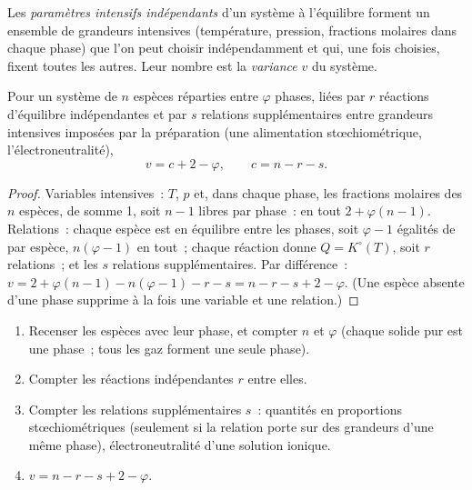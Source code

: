 \begin{definition}[Variance]\label{def:b2:equilibrium-shifts:variance}
Les \emph{paramètres intensifs indépendants}
d'un système à l'équilibre forment un ensemble de grandeurs intensives
(température, pression, fractions molaires dans chaque phase) que l'on peut choisir
indépendamment et qui, une fois choisies, fixent toutes les autres. Leur nombre est la
\emph{variance} $v$ du système.
\end{definition}

\begin{theorem}\label{thm:b2:equilibrium-shifts:phase-rule}
Pour un système de $n$ espèces réparties entre $\varphi$ phases, liées par $r$
réactions d'équilibre indépendantes et par $s$ relations supplémentaires entre
grandeurs intensives imposées par la préparation (une alimentation stœchiométrique,
l'électroneutralité),
\[
  v = c + 2 - \varphi, \qquad c = n - r - s .
\]
\end{theorem}

\begin{proof}
Variables intensives~: $T$, $p$ et, dans chaque phase, les fractions molaires des
$n$ espèces, de somme 1, soit $n - 1$ libres par phase~: en tout $2 +
\varphi(n - 1)$. Relations~: chaque espèce est en équilibre entre les
phases, soit $\varphi - 1$ égalités de  par espèce, $n(\varphi -
1)$ en tout~; chaque réaction donne $Q = K^\circ(T)$, soit $r$ relations~; et les $s$
relations supplémentaires. Par différence~: $v = 2 + \varphi(n - 1) - n(\varphi - 1) - r -
s = n - r - s + 2 - \varphi$. (Une espèce absente d'une phase supprime à la fois une
variable et une relation.)
\end{proof}

\begin{method}\label{met:b2:equilibrium-shifts:variance}
\begin{enumerate}
  \item Recenser les espèces avec leur phase, et compter $n$ et $\varphi$
        (chaque solide pur est une phase~; tous les gaz forment une seule phase).
  \item Compter les réactions indépendantes $r$ entre elles.
  \item Compter les relations supplémentaires $s$~: quantités en proportions stœchiométriques
        (seulement si la relation porte sur des grandeurs d'une même phase),
        électroneutralité d'une solution ionique.
  \item $v = n - r - s + 2 - \varphi$.
\end{enumerate}
\end{method}

